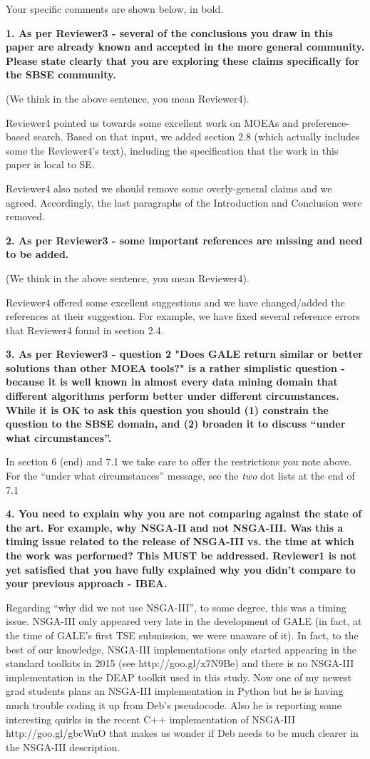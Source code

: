 \documentclass[10pt,journal,compsoc]{IEEEtran}
\begin{document}
Your specific comments are shown below, in bold.

{\bf 1.  As per Reviewer3 - several of the conclusions you draw in this paper are already known and accepted in the more general community.  Please state clearly that you are exploring these claims specifically for the SBSE community.}

(We think in the above sentence, you mean Reviewer4).

Reviewer4 pointed us towards some excellent work on MOEAs and preference-based search. Based on that input, we added section 2.8 (which actually includes some the Reviewer4’s text), including the specification that the work in this paper is local to SE.

Reviewer4 also noted we should remove some overly-general claims and we agreed. Accordingly, the last paragraphs of the Introduction and Conclusion were removed.

{\bf 2.  As per Reviewer3 - some important references are missing and need to be added.}

(We think in the above sentence, you mean Reviewer4).

Reviewer4 offered some excellent suggestions and we have changed/added the references at their suggestion. 
For example, we have  fixed several reference errors that Reviewer4 found in section 2.4.  

{\bf 3.  As per Reviewer3 - question 2 "Does GALE return similar or better solutions than other MOEA tools?" is a rather simplistic question - because it is well known in almost every data mining domain that different algorithms perform better under different circumstances.   While it is OK to ask this question you should (1) constrain the question to the SBSE domain, and (2) broaden it to discuss ``under what circumstances''.}

In section 6 (end) and 7.1 we take care to offer the restrictions you note above. 
For the ``under what circumstances'' message, see the {\em two} dot lists at the end of 7.1

{\bf 4. You need to explain why you are not comparing against the state of the art.  For example, why NSGA-II and not NSGA-III.  Was this a timing issue related to the release of NSGA-III vs. the time at which the work was performed?  This MUST be addressed.  Reviewer1 is not yet satisfied that you have fully explained why you didn't compare to your previous approach - IBEA.}

Regarding ``why did we not use NSGA-III'', to some degree, this was a timing issue. 
NSGA-III only appeared very late in the development of GALE (in fact, at the time of GALE’s first TSE submission, we were unaware of it). In fact, to the best of our knowledge, NSGA-III implementations only started appearing in the standard toolkits in 2015 (see http://goo.gl/x7N9Be)  and there is no NSGA-III implementation in the DEAP toolkit used in this study. 
Now one of my newest grad students plans an NSGA-III implementation in Python but he is having much trouble coding it up from Deb’s pseudocode. Also he is reporting some interesting quirks in the recent C++ implementation of NSGA-III http://goo.gl/gbcWnO that makes us wonder if Deb needs to be much clearer in the NSGA-III description.
\end{document}
